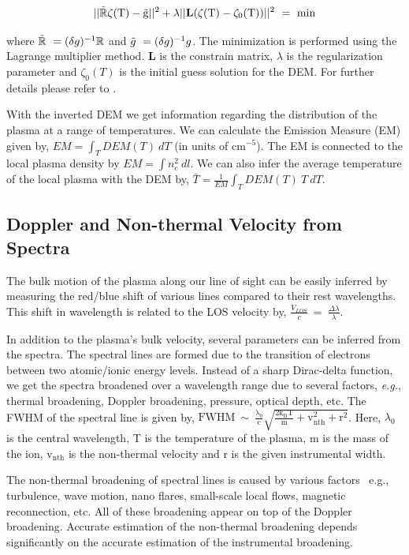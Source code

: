 \begin{equation}
    \mathrm{||\Tilde{\mathbb{R}}\zeta(T)-\Tilde{g}||^{2}+\lambda||{\bf L}(\zeta(T)-\zeta_{0}(T))||^{2}~=~min}
    \label{eqn:dem}
\end{equation}

where $\Tilde{\mathbb{R}}~=(\delta g)^{-1}\mathbb{R}$ and $\Tilde{g}~=(\delta g)^{-1} g$. The minimization is performed using the Lagrange multiplier method. {\bf L} is the constrain matrix, $\lambda$ is the regularization parameter and $\zeta_{0}(T)$ is the initial guess solution for the DEM. For further details please refer to \cite{hannah&kontar12}.

With the inverted DEM we get information regarding the distribution of the plasma at a range of temperatures. We can calculate the Emission Measure (EM) given by, $EM=\int_{T}DEM(T)~dT$ (in units of $\mathrm{cm^{-5}}$). The EM is connected to the local plasma density by $EM=\int n_{e}^{2}~dl$. We can also infer the average temperature of the local plasma with the DEM by, $\bar{T}=\frac{1}{EM}\int_{T}DEM(T)~T~dT$.

\subsection{Doppler and Non-thermal Velocity from Spectra}

The bulk motion of the plasma along our line of sight can be easily inferred by measuring the red/blue shift of various lines compared to their rest wavelengths. This shift in wavelength is related to the LOS velocity by, $\frac{V_{LOS}}{c}~=~\frac{\Delta \lambda}{\lambda}$.

In addition to the plasma's bulk velocity, several parameters can be inferred from the spectra. The spectral lines are formed due to the transition of electrons between two atomic/ionic energy levels. Instead of a sharp Dirac-delta function, we get the spectra broadened over a wavelength range due to several factors, {\it e.g.}, thermal broadening, Doppler broadening, pressure, optical depth, etc. The FWHM of the spectral line is given by, $\mathrm{FWHM~\sim~\frac{\lambda_{0}}{c}\sqrt{\frac{2k_{B}T}{m}+v_{nth}^{2}+r^{2}}}$. Here, $\lambda_{0}$ is the central wavelength, T is the temperature of the plasma, m is the mass of the ion, $\mathrm{v_{nth}}$ is the non-thermal velocity and r is the given instrumental width. 

The non-thermal broadening of spectral lines is caused by various factors {\, e.g.}, turbulence, wave motion, nano flares, small-scale local flows, magnetic reconnection, etc. All of these broadening appear on top of the Doppler broadening. Accurate estimation of the non-thermal broadening depends significantly on the accurate estimation of the instrumental broadening.

